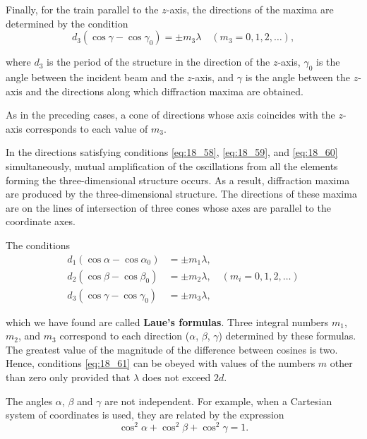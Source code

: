 Finally, for the train parallel to the $z$-axis, the directions of the maxima are determined by the condition
\begin{equation}\label{eq:18_60}
	d_3 (\cos\gamma - \cos\gamma_0) = \pm m_3 \lambda \quad (m_3=0,1,2,\ldots),
\end{equation}

\noindent
where $d_3$ is the period of the structure in the direction of the $z$-axis, $\gamma_0$ is the angle between the incident beam and the $z$-axis, and $\gamma$ is the angle between the $z$-axis and the directions along which diffraction maxima are obtained.

As in the preceding cases, a cone of directions whose axis coincides with the $z$-axis corresponds to each value of $m_3$.

In the directions satisfying conditions \eqref{eq:18_58}, \eqref{eq:18_59}, and \eqref{eq:18_60} simultaneously, mutual amplification of the oscillations from all the elements forming the three-dimensional structure occurs.
As a result, diffraction maxima are produced by the three-dimensional structure.
The directions of these maxima are on the lines of intersection of three cones whose axes are parallel to the coordinate axes.

The conditions
\begin{align}
		d_1 (\cos\alpha - \cos\alpha_0) &= \pm m_1 \lambda, \nonumber\\
		d_2 (\cos\beta - \cos\beta_0) &= \pm m_2 \lambda, \quad (m_i=0,1,2,\ldots) \label{eq:18_61}\\
		d_3 (\cos\gamma - \cos\gamma_0) &= \pm m_3 \lambda, \nonumber
\end{align}

\noindent
which we have found are called \textbf{Laue's formulas}.
Three integral numbers $m_1$, $m_2$, and $m_3$ correspond to each direction ($\alpha$, $\beta$, $\gamma$) determined by these formulas.
The greatest value of the magnitude of the difference between cosines is two.
Hence, conditions \eqref{eq:18_61} can be obeyed with values of the numbers $m$ other than zero only provided that $\lambda$ does not exceed $2d$.

The angles $\alpha$, $\beta$ and $\gamma$ are not independent.
For example, when a Cartesian system of coordinates is used, they are related by the expression
\vspace{-12pt}
\begin{equation}\label{eq:18_62}
	\cos^2\alpha + \cos^2\beta + \cos^2\gamma = 1.
\end{equation}

